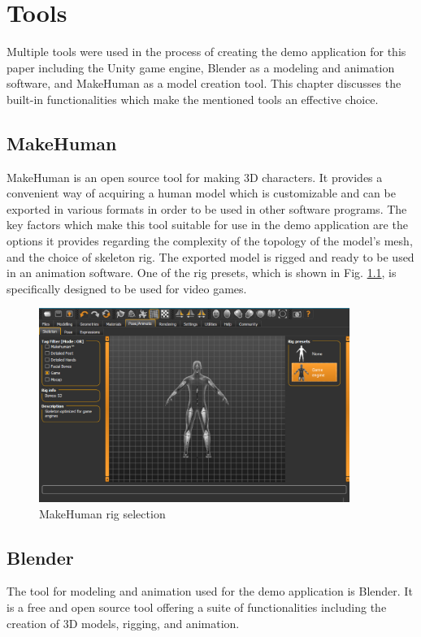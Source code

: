 \chapter{Tools} 
Multiple tools were used in the process of creating the demo application for
this paper including the Unity game engine, Blender as a modeling and animation
software, and MakeHuman as a model creation tool. This chapter discusses the
built-in functionalities which make the mentioned tools an effective choice.

\section{MakeHuman}
MakeHuman is an open source tool for making 3D characters. It provides
a convenient way of acquiring a human model which is customizable and can be
exported in various formats in order to be used in other software programs. The
key factors which make this tool suitable for use in the demo application are the
options it provides regarding the complexity of the topology of the model's
mesh, and the choice of skeleton rig. The exported model is rigged and ready to
be used in an animation software. One of the rig presets, which is shown in Fig.
\ref{fig:mh_rig}, is specifically designed to be used for video games.

\begin{figure}
    \centering
    \includegraphics[width=0.9\textwidth]{grafika/make_human_rig.eps}
    \caption{MakeHuman rig selection}
    \label{fig:mh_rig}
\end{figure}

\section{Blender}
The tool for modeling and animation used for the demo application is
Blender. It is a free and open source tool offering a suite of functionalities
including the creation of 3D models, rigging, and animation. 

